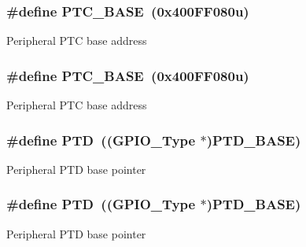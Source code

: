 \subsubsection[{\texorpdfstring{P\+T\+C\+\_\+\+B\+A\+SE}{PTC_BASE}}]{\setlength{\rightskip}{0pt plus 5cm}\#define P\+T\+C\+\_\+\+B\+A\+SE~(0x400\+F\+F080u)}\hypertarget{group__GPIO__Peripheral__Access__Layer_gafee763d072e472e36b335f8944b5de96}{}\label{group__GPIO__Peripheral__Access__Layer_gafee763d072e472e36b335f8944b5de96}
Peripheral P\+TC base address 
\subsubsection[{\texorpdfstring{P\+T\+C\+\_\+\+B\+A\+SE}{PTC_BASE}}]{\setlength{\rightskip}{0pt plus 5cm}\#define P\+T\+C\+\_\+\+B\+A\+SE~(0x400\+F\+F080u)}\hypertarget{group__GPIO__Peripheral__Access__Layer_gafee763d072e472e36b335f8944b5de96}{}\label{group__GPIO__Peripheral__Access__Layer_gafee763d072e472e36b335f8944b5de96}
Peripheral P\+TC base address 
\subsubsection[{\texorpdfstring{P\+TD}{PTD}}]{\setlength{\rightskip}{0pt plus 5cm}\#define P\+TD~(({\bf G\+P\+I\+O\+\_\+\+Type} $\ast$){\bf P\+T\+D\+\_\+\+B\+A\+SE})}\hypertarget{group__GPIO__Peripheral__Access__Layer_gacee2910b398755be94f612b243052efe}{}\label{group__GPIO__Peripheral__Access__Layer_gacee2910b398755be94f612b243052efe}
Peripheral P\+TD base pointer 
\subsubsection[{\texorpdfstring{P\+TD}{PTD}}]{\setlength{\rightskip}{0pt plus 5cm}\#define P\+TD~(({\bf G\+P\+I\+O\+\_\+\+Type} $\ast$){\bf P\+T\+D\+\_\+\+B\+A\+SE})}\hypertarget{group__GPIO__Peripheral__Access__Layer_gacee2910b398755be94f612b243052efe}{}\label{group__GPIO__Peripheral__Access__Layer_gacee2910b398755be94f612b243052efe}
Peripheral P\+TD base pointer 
